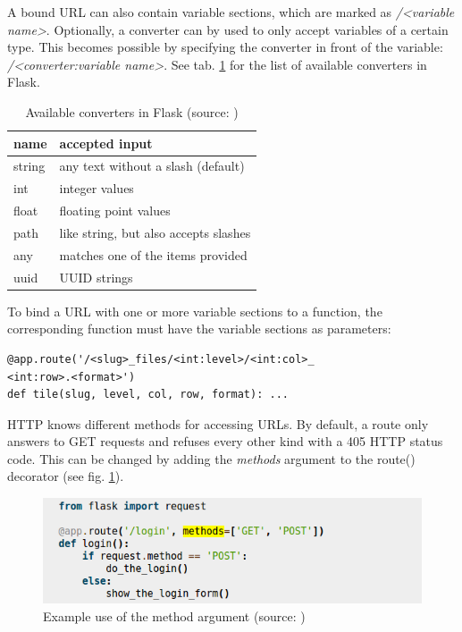 A bound URL can also contain variable sections, which are marked as \emph{/{\textless}variable name{\textgreater}}. Optionally, a converter can by used to only accept variables of a certain type. This becomes possible by specifying the converter in front of the variable: \emph{/{\textless}converter:variable name{\textgreater}}\cite{web:flask}. See tab. \ref{tab4_converter} for the list of available converters in Flask.

\begin{table}[H]
	\begin{center}
		\begin{tabular}{| l | l |}
			\hline
			\textbf{name} & \textbf{accepted input}\\ \hline
			string & any text without a slash (default)\\ \hline
			int & integer values\\ \hline
			float & floating point values\\ \hline
			path & like string, but also accepts slashes \\ \hline
			any & matches one of the items provided\\ \hline
			uuid & UUID strings\\ \hline
		\end{tabular}
		\caption{Available converters in Flask (source: \cite{web:flask})}
		\label{tab4_converter}
	\end{center}
\end{table}

To bind a URL with one or more variable sections to a function, the corresponding function must have the variable sections as parameters:

\begin{lstlisting}[frame=single]
@app.route('/<slug>_files/<int:level>/<int:col>_
<int:row>.<format>')
def tile(slug, level, col, row, format): ...
\end{lstlisting}

HTTP knows different methods for accessing URLs. By default, a route only answers to GET requests and refuses every other kind with a 405 HTTP status code. This can be changed by adding the \emph{methods} argument to the route() decorator (see fig. \ref{fig4_methods})\cite{web:flask}.

\begin{figure}[H]
	\begin{center}
		\includegraphics[scale=0.5]{img/HTTPmethods.png}
		\caption{Example use of the method argument (source: \cite{web:flask})}
		\label{fig4_methods}
	\end{center}
\end{figure}

